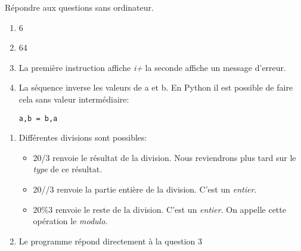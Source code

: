 \documentclass[a4paper,11pt]{article}
\begin{document}
\begin{Form}
\begin{exo}
Répondre aux questions sans ordinateur.
\begin{enumerate}
\item 6
\item 64
\item La première instruction affiche \emph{i+} la seconde affiche un message d'erreur.
\item La séquence inverse les valeurs de a et b. En Python il est possible de faire cela sans valeur intermédiaire:
\begin{lstlisting}
a,b = b,a
\end{lstlisting}
\end{enumerate}
\end{exo}
\begin{exo}

\end{exo}
\begin{exo}

\end{exo}
\begin{exo}

\end{exo}
\begin{exo}
\begin{enumerate}
\item Différentes divisions sont possibles:
\begin{itemize}
\item 20/3 renvoie le résultat de la division. Nous reviendrons plus tard sur le \emph{type} de ce résultat.
\item 20//3 renvoie la partie entière de la division. C'est un \emph{entier}.
\item 20\%3 renvoie le reste de la division. C'est un \emph{entier}. On appelle cette opération le \emph{modulo}.
\end{itemize}
\item Le programme répond directement à la question 3

\end{enumerate}
\end{exo}
\begin{exo}

\end{exo}
\begin{exo}

\end{exo}
\begin{exo}

\end{exo}
\begin{exo}

\end{exo}
\begin{exo}

\end{exo}
\end{Form}
\end{document}
